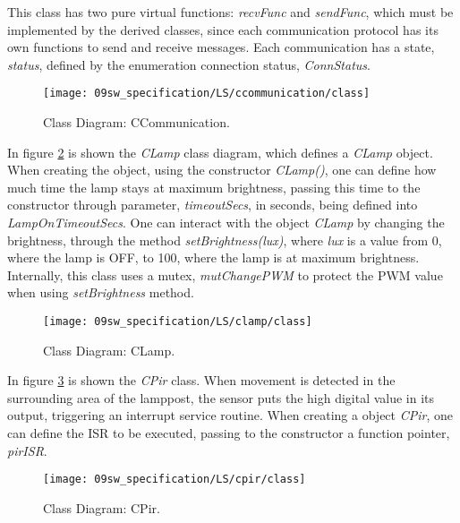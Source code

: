 This class has two pure virtual functions: \textit{recvFunc} and \textit{sendFunc}, which must be implemented by the derived classes, since each communication protocol has its own functions to send and receive messages. Each communication has a state, \textit{status}, defined by the enumeration connection status, \textit{ConnStatus}.

\begin{figure}[H]
	\centering
	\texttt{[image: 09sw\_specification/LS/ccommunication/class]}
	\caption{Class Diagram: CCommunication.}
	\label{fig:CCommunicationClass}
\end{figure}

\clearpage
{}

In figure \ref{fig:classlamp} is shown the \textit{CLamp} class diagram, which defines a \textit{CLamp} object. When creating the object, using the constructor \textit{CLamp()}, one can define how much time the lamp stays at maximum brightness, passing this time to the constructor through parameter, \textit{timeoutSecs}, in seconds, being defined into \textit{LampOnTimeoutSecs}.
One can interact with the object \textit{CLamp} by changing the brightness, through the method \textit{setBrightness(lux)}, where \textit{lux} is a value from 0, where the lamp is OFF, to 100, where the lamp is at maximum brightness.  Internally, this class uses a mutex, \textit{mutChangePWM} to protect the PWM value when using \textit{setBrightness} method. 

\begin{figure}[H]
	\centering
	\texttt{[image: 09sw\_specification/LS/clamp/class]}
	\caption{Class Diagram: CLamp.}
	\label{fig:classlamp}
\end{figure}

{}

In figure \ref{fig:classpir} is shown the \textit{CPir} class. When movement is detected in the surrounding area of the lamppost, the sensor puts the high digital value in its output, triggering an interrupt service routine. When creating a object \textit{CPir}, one can define the ISR to be executed, passing to the constructor a function pointer, \textit{pirISR}.

\begin{figure}[H]
	\centering
	\texttt{[image: 09sw\_specification/LS/cpir/class]}
	\caption{Class Diagram: CPir.}
	\label{fig:classpir}
\end{figure}


